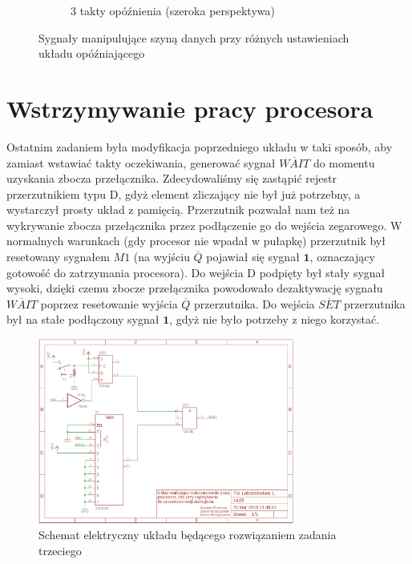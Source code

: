 \documentclass[fleqn]{article}
\begin{document}
\begin{figure}[H]
\begin{subfigure}[b]{0.49\textwidth}
	\caption{3 takty opóźnienia (szeroka perspektywa)}
	\label{fig:2f}
\end{subfigure}
	\caption{Sygnały manipulujące szyną danych przy różnych ustawieniach układu opóźniającego}
	\label{fig:2}
\end{figure}

\pagebreak

\section{Wstrzymywanie pracy procesora}

Ostatnim zadaniem była modyfikacja poprzedniego układu w taki sposób, aby zamiast wstawiać takty oczekiwania, generować sygnał $\overline{WAIT}$ do momentu uzyskania zbocza przełącznika.
Zdecydowaliśmy się zastąpić rejestr przerzutnikiem typu D, gdyż element zliczający nie był już potrzebny, a wystarczył prosty układ z pamięcią. Przerzutnik pozwalał nam też na wykrywanie zbocza przełącznika przez podłączenie go do wejścia zegarowego.
W normalnych warunkach (gdy procesor nie wpadał w pułapkę) przerzutnik był resetowany sygnałem $M1$ (na wyjściu $\overline{Q}$ pojawiał się sygnał $\textbf{1}$, oznaczający gotowość do zatrzymania procesora). Do wejścia D podpięty był stały sygnał wysoki, dzięki czemu zbocze przełącznika powodowało dezaktywację sygnału $\overline{WAIT}$ poprzez resetowanie wyjścia $\overline{Q}$ przerzutnika. Do wejścia $\overline{SET}$ przerzutnika był na stałe podłączony sygnał $\textbf{1}$, gdyż nie było potrzeby z niego korzystać.

\begin{figure}[H]
	\centering
	\includegraphics[width=0.75\textwidth]{img/z3.png}
	\caption{Schemat elektryczny układu będącego rozwiązaniem zadania trzeciego}
	\label{fig:z3}
\end{figure}
\end{document}
